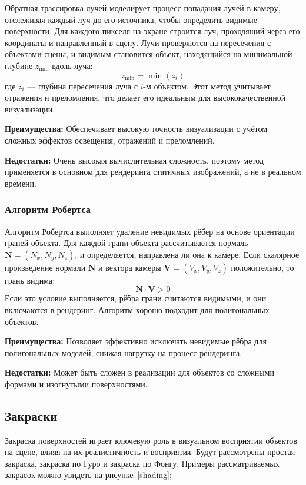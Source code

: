 Обратная трассировка лучей моделирует процесс попадания лучей в камеру, отслеживая каждый луч до его источника, чтобы определить видимые поверхности. Для каждого пикселя на экране строится луч, проходящий через его координаты и направленный в сцену. Лучи проверяются на пересечения с объектами сцены, и видимым становится объект, находящийся на минимальной глубине $z_{\text{min}}$ вдоль луча:
$$
z_{\text{min}} = \min(z_i)
$$
где $z_i$ — глубина пересечения луча с $i$-м объектом. Этот метод учитывает отражения и преломления, что делает его идеальным для высококачественной визуализации.


\textbf{Преимущества:} Обеспечивает высокую точность визуализации с учётом сложных эффектов освещения, отражений и преломлений.

\textbf{Недостатки:} Очень высокая вычислительная сложность, поэтому метод применяется в основном для рендеринга статичных изображений, а не в реальном времени.

\subsubsection{Алгоритм Робертса}

Алгоритм Робертса выполняет удаление невидимых рёбер на основе ориентации граней объекта. Для каждой грани объекта рассчитывается нормаль $\mathbf{N} = (N_x, N_y, N_z)$, и определяется, направлена ли она к камере. Если скалярное произведение нормали $\mathbf{N}$ и вектора камеры $\mathbf{V} = (V_x, V_y, V_z)$ положительно, то грань видима:
$$
\mathbf{N} \cdot \mathbf{V} > 0
$$
Если это условие выполняется, рёбра грани считаются видимыми, и они включаются в рендеринг. Алгоритм хорошо подходит для полигональных объектов.


\textbf{Преимущества:} Позволяет эффективно исключать невидимые рёбра для полигональных моделей, снижая нагрузку на процесс рендеринга.

\textbf{Недостатки:} Может быть сложен в реализации для объектов со сложными формами и изогнутыми поверхностями.

\subsection{Закраски}

Закраска поверхностей играет ключевую роль в визуальном восприятии объектов на сцене, влияя на их реалистичность и восприятия. Будут рассмотрены простая закраска, закраска по Гуро и закраска по Фонгу. Примеры рассматриваемых закрасок можно увидеть на рисунке~\ref{shading};

